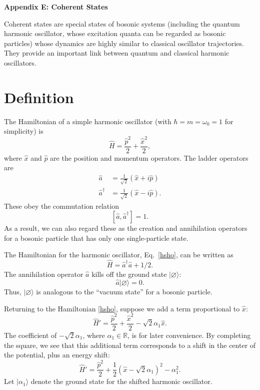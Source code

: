 \documentclass[prx,12pt]{revtex4-2}
\begin{document}
\begin{center}
{\large \textbf{Appendix E: Coherent States}}
\end{center}

Coherent states are special states of bosonic systems (including the
quantum harmonic oscillator, whose excitation quanta can be regarded
as bosonic particles) whose dynamics are highly similar to classical
oscillator trajectories.  They provide an important link between
quantum and classical harmonic oscillators.

\section{Definition}

The Hamiltonian of a simple harmonic oscillator (with $\hbar = m =
\omega_0 = 1$ for simplicity) is
\begin{equation}
  \hat{H} = \frac{\hat{p}^2}{2} + \frac{\hat{x}^2}{2},
  \label{hsho}
\end{equation}
where $\hat{x}$ and $\hat{p}$ are the position and momentum operators.
The ladder operators are
\begin{align}
  \hat{a} &= \frac{1}{\sqrt{2}} \left(\hat{x} + i\hat{p}\right)
  \label{a} \\
  \hat{a}^\dagger &= \frac{1}{\sqrt{2}} \left(\hat{x} - i\hat{p}\right).
  \label{adagger}
\end{align}
These obey the commutation relation
\begin{equation}
  \left[\hat{a}, \hat{a}^\dagger\right] = 1.
  \label{commutator}
\end{equation}
As a result, we can also regard these as the creation and annihilation
operators for a bosonic particle that has only one single-particle
state.

The Hamiltonian for the harmonic oscillator, Eq.~\eqref{hsho}, can be
written as
\begin{equation}
  \hat{H} = \hat{a}^\dagger\hat{a} + 1/2.
\end{equation}
The annihilation operator $\hat{a}$ kills off the ground state
$|\varnothing\rangle$:
\begin{equation}
  \hat{a} |\varnothing\rangle = 0.
  \label{annihilation}
\end{equation}
Thus, $|\varnothing\rangle$ is analogous to the ``vacuum state'' for a
bosonic particle.

Returning to the Hamiltonian \eqref{hsho}, suppose we add a term
proportional to $\hat{x}$:
\begin{equation}
  \hat{H}' = \frac{\hat{p}^2}{2} + \frac{\hat{x}^2}{2} - \sqrt{2}\alpha_1\hat{x}.
  \label{hshift}
\end{equation}
The coefficient of $-\sqrt{2}\alpha_1$, where $\alpha_1 \in
\mathbb{R}$, is for later convenience.  By completing the square, we
see that this additional term corresponds to a shift in the center of
the potential, plus an energy shift:
\begin{equation}
  \hat{H}' = \frac{\hat{p}^2}{2} + \frac{1}{2}\left(\hat{x} - \sqrt{2}\alpha_1\right)^2 - \alpha_1^2.
\end{equation}
Let $|\alpha_1\rangle$ denote the ground state for the shifted
harmonic oscillator.
\end{document}
